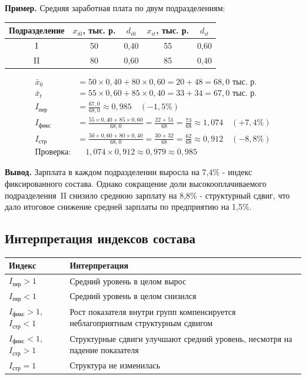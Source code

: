 \documentclass[a4paper]{article}
\begin{document}
	\textbf{Пример.} Средняя заработная плата по двум подразделениям:
	
	\begin{center}
		\renewcommand{\arraystretch}{1.3}
		\begin{tabular}{ccccc}
			\toprule
			Подразделение & $x_{i0}$, тыс. р. & $d_{i0}$ & $x_{it}$, тыс. р. & $d_{it}$ \\
			\midrule
			I  & 50 & 0{,}40 & 55 & 0{,}60 \\
			II & 80 & 0{,}60 & 85 & 0{,}40 \\
			\bottomrule
		\end{tabular}
	\end{center}
	
	\begin{align*}
		\bar{x}_0 &= 50\times0{,}40 + 80\times0{,}60 = 20+48 = 68{,}0 \text{ тыс. р.}\\
		\bar{x}_t &= 55\times0{,}60 + 85\times0{,}40 = 33+34 = 67{,}0 \text{ тыс. р.}\\[4pt]
		I_{\text{пер}} &= \frac{67{,}0}{68{,}0} \approx 0{,}985 \quad (-1{,}5\%)\\[4pt]
		I_{\text{фикс}} &= \frac{55\times0{,}40+85\times0{,}60}{68{,}0}
		= \frac{22+51}{68} = \frac{73}{68} \approx 1{,}074 \quad (+7{,}4\%)\\[4pt]
		I_{\text{стр}} &= \frac{50\times0{,}60+80\times0{,}40}{68{,}0}
		= \frac{30+32}{68} = \frac{62}{68} \approx 0{,}912 \quad (-8{,}8\%)\\[4pt]
		\text{Проверка:} &\quad 1{,}074 \times 0{,}912 \approx 0{,}979 \approx 0{,}985
		\;\; 
	\end{align*}
	
	\textbf{Вывод.} Зарплата в каждом подразделении выросла на 7{,}4\% - индекс
	фиксированного состава. Однако сокращение доли высокооплачиваемого
	подразделения~II снизило среднюю зарплату на 8{,}8\% - структурный сдвиг,
	что дало итоговое снижение средней зарплаты по предприятию на 1{,}5\%.


\subsection{Интерпретация индексов состава}

\begin{center}
	\renewcommand{\arraystretch}{1.4}
	\begin{tabular}{p{4.2cm} p{8cm}}
		\toprule
		\textbf{Индекс} & \textbf{Интерпретация} \\
		\midrule
		$I_{\text{пер}} > 1$ & Средний уровень в целом вырос \\
		$I_{\text{пер}} < 1$ & Средний уровень в целом снизился \\
		$I_{\text{фикс}} > 1$, $I_{\text{стр}} < 1$ & Рост показателя внутри групп
		компенсируется неблагоприятным структурным сдвигом \\
		$I_{\text{фикс}} < 1$, $I_{\text{стр}} > 1$ & Структурные сдвиги улучшают
		средний уровень, несмотря на падение показателя \\
		$I_{\text{стр}} = 1$ & Структура не изменилась \\
		\bottomrule
	\end{tabular}
\end{center}
\end{document}
